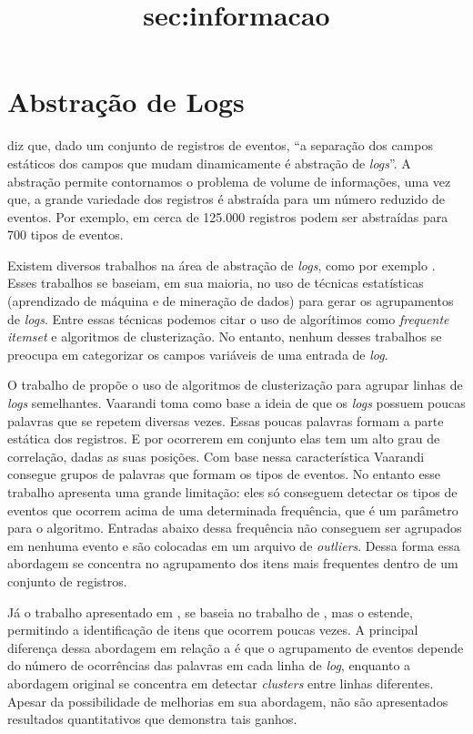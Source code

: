 \documentclass[
	12pt,				%
	openright,			%
	twoside,			%
	a4paper,			%
	english,			%
	spanish,			%
	brazil,				%
	]{abntex2}
\begin{document}
\section{Abstração de Logs}\title{sec:informacao}
\cite{nagappan2010abstracting} diz que, dado um conjunto de registros de eventos, ``a separação dos campos estáticos dos campos que mudam dinamicamente é abstração de \emph{logs}''. A abstração permite contornamos o problema de volume de informações, uma vez que, a grande variedade dos registros é abstraída para um número reduzido de eventos. Por exemplo, em \cite{nagappan2010abstracting} cerca de  125.000 registros podem ser abstraídas para 700 tipos de eventos.

Existem diversos trabalhos na área de abstração de \emph{logs}, como por exemplo \cite{jiang2008automated, nagappan2010abstracting, vaarandi2003data, xu2009detecting}. Esses trabalhos se baseiam, em sua maioria, no uso de técnicas estatísticas (aprendizado de máquina e de mineração de dados) para gerar os agrupamentos de \emph{logs}. Entre essas técnicas podemos citar o uso de algorítimos como \emph{frequente itemset} e algoritmos de clusterização. No entanto, nenhum desses trabalhos se preocupa em categorizar os campos variáveis de uma entrada de \emph{log}.

O trabalho de \cite{vaarandi2003data} propõe o uso de algoritmos de clusterização para agrupar linhas de \emph{logs} semelhantes. Vaarandi toma como base a ideia de que os \emph{logs} possuem poucas palavras que se repetem diversas vezes. Essas poucas palavras formam a parte estática dos registros. E por ocorrerem em conjunto elas tem um alto grau de correlação, dadas as suas posições. Com base nessa característica Vaarandi consegue grupos de palavras que formam os tipos de eventos. No entanto esse trabalho apresenta uma grande limitação: eles só conseguem detectar os tipos de eventos que ocorrem acima de uma determinada frequência, que é um parâmetro para o algoritmo. Entradas abaixo dessa frequência não conseguem ser agrupados em nenhuma evento e são colocadas em um arquivo de \emph{outliers}. Dessa forma essa abordagem se concentra no agrupamento dos itens mais frequentes dentro de um conjunto de registros.

Já o trabalho apresentado em \cite{nagappan2010abstracting}, se baseia no trabalho de \cite{vaarandi2003data}, mas o estende, permitindo a identificação de itens que ocorrem poucas vezes. A principal diferença dessa abordagem em relação a \cite{vaarandi2003data} é que o agrupamento de eventos depende do número de ocorrências das palavras em cada linha de \emph{log}, enquanto a abordagem original se concentra em detectar \emph{clusters} entre linhas diferentes. Apesar da possibilidade de melhorias em sua abordagem, não são apresentados resultados quantitativos que demonstra tais ganhos.
\end{document}
